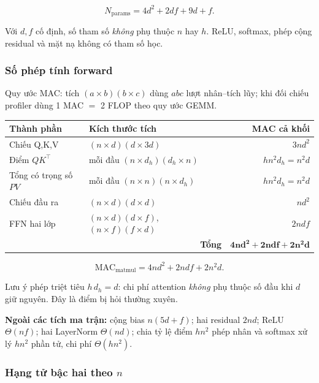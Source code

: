 \begin{equation}
  N_{\mathrm{params}}=4d^2+2df+9d+f.
  \label{eq:c2-params}
\end{equation}

Với $d,f$ cố định, số tham số \emph{không} phụ thuộc $n$ hay $h$. ReLU, softmax,
phép cộng residual và mặt nạ không có tham số học.

\subsubsection{Số phép tính forward}

Quy ước MAC: tích $(a\times b)(b\times c)$ dùng $abc$ lượt nhân--tích lũy; khi đối
chiếu profiler dùng 1 MAC $=$ 2 FLOP theo quy ước GEMM.

\begin{center}
\begin{tabular}{llr}
\toprule
\textbf{Thành phần} & \textbf{Kích thước tích} & \textbf{MAC cả khối}\\
\midrule
Chiếu Q,K,V & $(n\times d)(d\times 3d)$ & $3nd^2$\\
Điểm $QK^\top$ & mỗi đầu $(n\times d_h)(d_h\times n)$ & $hn^2d_h=n^2d$\\
Tổng có trọng số $PV$ & mỗi đầu $(n\times n)(n\times d_h)$ & $hn^2d_h=n^2d$\\
Chiếu đầu ra & $(n\times d)(d\times d)$ & $nd^2$\\
FFN hai lớp & $(n\times d)(d\times f)$, $(n\times f)(f\times d)$ & $2ndf$\\
\midrule
\multicolumn{2}{r}{\textbf{Tổng}} & $\mathbf{4nd^2+2ndf+2n^2d}$\\
\bottomrule
\end{tabular}
\end{center}

\begin{equation}
  \mathrm{MAC}_{\mathrm{matmul}}=4nd^2+2ndf+2n^2d.
  \label{eq:c2-mac}
\end{equation}

Lưu ý phép triệt tiêu $h\,d_h=d$: chi phí attention \emph{không} phụ thuộc số đầu
khi $d$ giữ nguyên. Đây là điểm bị hỏi thường xuyên.

\textbf{Ngoài các tích ma trận:} cộng bias $n(5d+f)$; hai residual $2nd$; ReLU
$\Theta(nf)$; hai LayerNorm $\Theta(nd)$; chia tỷ lệ điểm $hn^2$ phép nhân và
softmax xử lý $hn^2$ phần tử, chi phí $\Theta(hn^2)$.

\subsubsection{Hạng tử bậc hai theo $n$}

